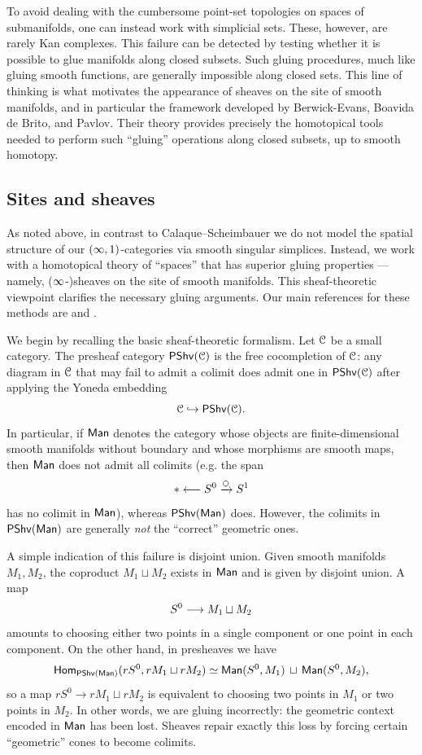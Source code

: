 To avoid dealing with the cumbersome point-set topologies on spaces of submanifolds, one can instead work with simplicial sets. These, however, are rarely Kan complexes. This failure can be detected by testing whether it is possible to glue manifolds along closed subsets. Such gluing procedures, much like gluing smooth functions, are generally impossible along closed sets. This line of thinking is what motivates the appearance of sheaves on the site of smooth manifolds, and in particular the framework developed by Berwick-Evans, Boavida de Brito, and Pavlov. Their theory provides precisely the homotopical tools needed to perform such “gluing” operations along closed subsets, up to smooth homotopy.



\subsection{Sites and sheaves}

As noted above, in contrast to Calaque--Scheimbauer we do not model the spatial
structure of our $(\operatorname{\infty},1)$-categories via smooth singular simplices. Instead,
we work with a homotopical theory of ``spaces'' that has superior gluing
properties — namely, ($\operatorname{\infty}$-)sheaves on the site of smooth manifolds.  This sheaf-theoretic viewpoint clarifies the necessary gluing arguments. Our main references for these methods are
\cite{BBEP24} and \cite{MW07}. 

\medskip

We begin by recalling the basic sheaf-theoretic formalism. Let $\mathcal C$ be a small category. The presheaf category $\operatorname{\sf PShv}(\mathcal C)$ is the free cocompletion of $\mathcal C$: any diagram in $\mathcal C$ that may fail to admit a colimit does admit one in $\operatorname{\sf PShv}(\mathcal C)$ after applying the Yoneda embedding
\begin{equation}
  \mathcal C \hookrightarrow \operatorname{\sf PShv}(\mathcal C).
\end{equation}
In particular, if $\operatorname{\sf Man}$ denotes the category whose objects are
finite-dimensional smooth manifolds without boundary and whose morphisms are
smooth maps, then $\operatorname{\sf Man}$ does not admit all colimits (e.g. the span
\[
* \longleftarrow S^0 \xra{\nssphere} S^1
\]
has no colimit in $\operatorname{\sf Man}$), whereas $\operatorname{\sf PShv}(\operatorname{\sf Man})$ does. However, the colimits in
$\operatorname{\sf PShv}(\operatorname{\sf Man})$ are generally \emph{not} the ``correct'' geometric ones.

A simple indication of this failure is disjoint union. Given smooth manifolds
$M_1,M_2$, the coproduct $M_1\sqcup M_2$ exists in $\operatorname{\sf Man}$ and is given by
disjoint union. A map
\[
S^0 \longrightarrow M_1 \sqcup M_2
\]
amounts to choosing either two points in a single component or one point in
each component. On the other hand, in presheaves we have
\[
\operatorname{\sf Hom}_{\operatorname{\sf PShv}(\operatorname{\sf Man})}(rS^0,rM_1 \sqcup rM_2)
\simeq \operatorname{\sf Man}(S^0,M_1)\,\sqcup\,\operatorname{\sf Man}(S^0,M_2),
\]
so a map $rS^0 \to rM_1 \sqcup rM_2$ is equivalent to choosing two points in
$M_1$ or two points in $M_2$. In other words, we are gluing incorrectly: the
geometric context encoded in $\operatorname{\sf Man}$ has been lost. Sheaves repair exactly this
loss by forcing certain ``geometric'' cones to become colimits.

